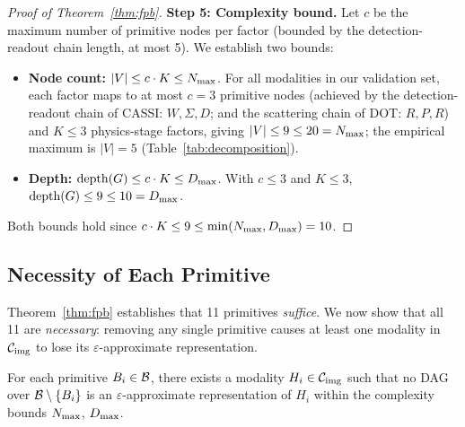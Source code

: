\documentclass[11pt]{article}
\begin{document}
\begin{proof}[Proof of Theorem~\ref{thm:fpb}]
\textbf{Step 5: Complexity bound.} Let $c$ be the maximum number of primitive nodes per factor (bounded by the detection-readout chain length, at most 5). We establish two bounds:
\begin{itemize}
  \item \textbf{Node count:} $|V| \leq c \cdot K \leq N_{\max}$. For all modalities in our validation set, each factor maps to at most $c = 3$ primitive nodes (achieved by the detection-readout chain of CASSI: $W, \Sigma, D$; and the scattering chain of DOT: $R, P, R$) and $K \leq 3$ physics-stage factors, giving $|V| \leq 9 \leq 20 = N_{\max}$; the empirical maximum is $|V| = 5$ (Table~\ref{tab:decomposition}).
  \item \textbf{Depth:} $\mathrm{depth}(G) \leq c \cdot K \leq D_{\max}$. With $c \leq 3$ and $K \leq 3$, $\mathrm{depth}(G) \leq 9 \leq 10 = D_{\max}$.
\end{itemize}
Both bounds hold since $c \cdot K \leq 9 \leq \min(N_{\max}, D_{\max}) = 10$.
\end{proof}

\subsection{Necessity of Each Primitive}

Theorem~\ref{thm:fpb} establishes that 11 primitives \emph{suffice}. We now show that all 11 are \emph{necessary}: removing any single primitive causes at least one modality in $\mathcal{C}_{\mathrm{img}}$ to lose its $\varepsilon$-approximate representation.

\begin{proposition}
\label{prop:necessity}
For each primitive $B_i \in \mathcal{B}$, there exists a modality $H_i \in \mathcal{C}_{\mathrm{img}}$ such that no DAG over $\mathcal{B} \setminus \{B_i\}$ is an $\varepsilon$-approximate representation of $H_i$ within the complexity bounds $N_{\max}$, $D_{\max}$.
\end{proposition}
\end{document}
